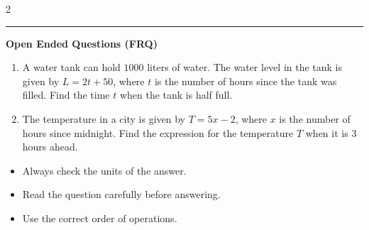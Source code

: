 \documentclass[10pt]{article}
\begin{document}
\begin{multicols}{2}
\begin{enumerate}[label=\textbf{Q\arabic*.}, leftmargin=*, itemsep=6pt, parsep=0pt]
\end{enumerate}
\end{multicols}

\vspace{-0.2cm}
\hrule
\vspace{0.2cm}
\textbf{\small Open Ended Questions (FRQ)}
\begin{enumerate}[label=\textbf{Q\arabic*.}, start=9, itemsep=5pt, topsep=0pt]

  \item \small A water tank can hold $1000$ liters of water. The water level in the tank is given by $L = 2t + 50$, where $t$ is the number of hours since the tank was filled. Find the time $t$ when the tank is half full. \vspace{2cm}

  \item \small The temperature in a city is given by $T = 5x - 2$, where $x$ is the number of hours since midnight. Find the expression for the temperature $T$ when it is $3$ hours ahead. \vspace{2cm}

\end{enumerate}

\vfill

\begin{tcolorbox}[colback=blue!5, colframe=mainblue!50, title=\small \textbf{Chef's Tips}, fonttitle=\bfseries, bottom=1mm]
\begin{itemize}[noitemsep, topsep=2pt, leftmargin=0.5cm]
  \item \scriptsize Always check the units of the answer.\item \scriptsize Read the question carefully before answering.\item \scriptsize Use the correct order of operations.
\end{itemize}
\end{tcolorbox}
\end{document}
